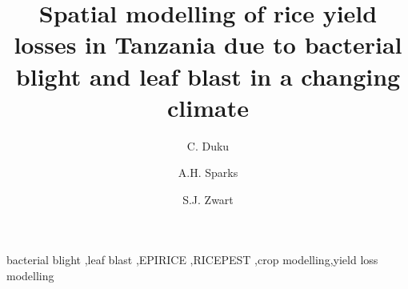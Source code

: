 \documentclass[preprint,review,12pt]{elsarticle}
\begin{document}
    
    
    \begin{frontmatter}
    
    
    
    \title{Spatial modelling of rice yield losses in Tanzania due to bacterial blight and leaf blast in a changing climate} 
    
    
    \author[AfricaRice]{C. Duku}
    \author[IRRI]{A.H. Sparks}
    \author[AfricaRice]{S.J. Zwart}
    
    
    \address[AfricaRice]{Africa Rice Center (AfricaRice), 01 BP 2031, Cotonou, BENIN}
    \address[IRRI]{International Rice Research Institute (IRRI), DAPO Box 7777, Metro Manila, 1301, PHILIPPINES}
    
    \begin{abstract}
    
    \end{abstract}
    
    \begin{keyword}
    bacterial blight \sep leaf blast \sep EPIRICE \sep RICEPEST \sep crop modelling\sep yield loss modelling
    \end{keyword}
    
    \end{frontmatter}
    
\end{document}
